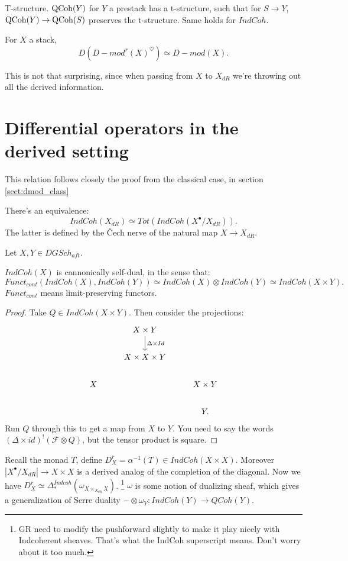 T-structure. $\mathrm{QCoh}(Y)$ for $Y$ a prestack has a t-structure, such that for $S \to Y$, $\mathrm{QCoh}(Y) \to \mathrm{QCoh}(S)$ preserves
the t-structure. Same holds for $IndCoh$.

\begin{prop}
For $X$ a stack,
\[	D (D-mod^r(X)^{\heartsuit}) \simeq D-mod(X)	.\]
\end{prop}

\begin{rem}
This is not that surprising, since when passing from $X$ to $X_{dR}$ we're throwing out all the derived information.
\end{rem}


\section{Differential operators in the derived setting}
This relation follows closely the proof from the classical case, in section \ref{sect:dmod_class}

\begin{prop}[GR 3.1.3]
There's an equivalence:
\[	IndCoh(X_{dR}) \simeq Tot(IndCoh(X^{\bullet}/X_{dR})).	\]
The latter is defined by the \v{C}ech nerve of the natural map $X \to X_{dR}$.
\end{prop}

Let $X,Y \in DGSch_{aft}$.
\begin{prop}
$IndCoh(X)$ is cannonically self-dual, in the sense that:
\[	Funct_{cont}(IndCoh(X), IndCoh(Y)) \simeq IndCoh(X) \otimes IndCoh(Y) \simeq IndCoh(X \times Y).	\]
$Funct_{cont}$ means limit-preserving functors.
\end{prop}
\begin{proof}
Take $Q \in IndCoh(X \times Y)$. Then consider the projections:
\[
\begin{tikzcd}
\; & X  \times Y\arrow{d}{\Delta \times Id} & \\
\; & X \times X \times Y & \\
X & & X \times Y \\
& & Y .
\end{tikzcd}
\]
Run $Q$ through this to get a map from $X$ to $Y$. You need to say the words $(\Delta \times id)^! (\mathcal{F} \otimes
Q)$, but the tensor product is square.
\end{proof}

Recall the monad $T$, define $D_X^r = \alpha^{-1}(T) \in IndCoh(X\times X)$. Moreover $|X^{\bullet}/X_{dR}| \to X \times X$
is a derived analog of the completion of the diagonal. Now we have $D_X^r \simeq \Delta_*^{Indcoh}(\omega_{X \times_{X_{dR}} X})$.
\footnote{GR need to modify the pushforward slightly to make it play nicely with Indcoherent sheaves. That's what the
IndCoh superscript means. Don't worry about it too much.} $\omega$ is some notion of dualizing sheaf, which gives a generalization
of Serre duality $ - \otimes \omega_Y : IndCoh(Y) \to QCoh(Y)$.

